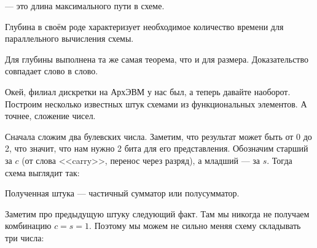 \documentclass{article}
\begin{document}
\begin{itemize}
\begin{Comment}
        \end{Comment}
        \dfn {} --- это длина максимального пути в схеме.
        \begin{Comment}
            Глубина в своём роде характеризует необходимое количество времени для параллельного вычисления схемы.
        \end{Comment}
        \thm Для глубины выполнена та же самая теорема, что и для размера. Доказательство совпадает слово в слово.
        \begin{Comment}
            Окей, филиал дискретки на АрхЭВМ у нас был, а теперь давайте наоборот. Построим несколько известных штук схемами из функциональных элементов. А точнее, сложение чисел.
        \end{Comment}
        \begin{Example}
            Сначала сложим два булевских числа. Заметим, что результат может быть от 0 до 2, что значит, что нам нужно 2 бита для его представления. Обозначим старший за $c$ (от слова <<carry>>, перенос через разряд), а младший --- за $s$. Тогда схема выглядит так:
            \begin{center}\end{center}
            Полученная штука --- частичный сумматор или полусумматор.
        \end{Example}
        \begin{Example}
            Заметим про предыдущую штуку следующий факт. Там мы никогда не получаем комбинацию $c=s=1$. Поэтому мы можем не сильно меняя схему складывать три числа:
            \begin{center}
\end{center}
\end{Example}
\end{itemize}
\end{document}
